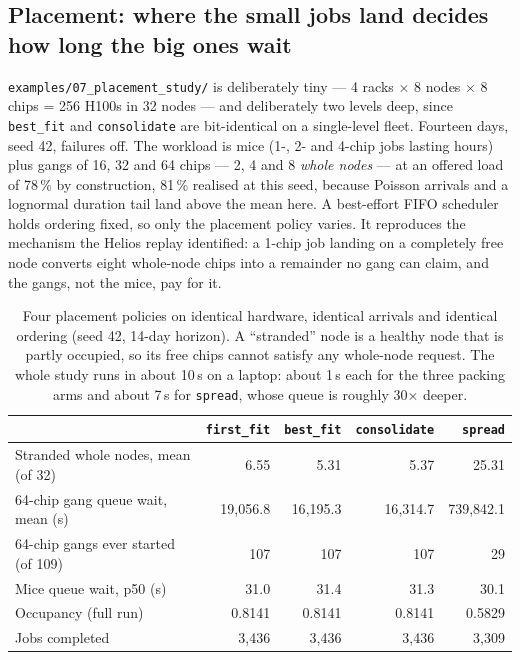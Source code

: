 \subsection{Placement: where the small jobs land decides how long the big ones
wait}\label{sec:case-placement}

\texttt{examples/07\_placement\_study/} is deliberately tiny --- 4 racks
$\times$ 8 nodes $\times$ 8 chips = 256 H100s in 32 nodes --- and deliberately
two levels deep, since \texttt{best\_fit} and \texttt{consolidate} are
bit-identical on a single-level fleet. Fourteen days, seed 42, failures off.
The workload is mice (1-, 2- and 4-chip jobs lasting hours) plus gangs of
16, 32 and 64 chips --- 2, 4 and 8 \emph{whole nodes} --- at an offered load of
78\,\% by construction, 81\,\% realised at this seed, because Poisson arrivals
and a lognormal duration tail land above the mean here. A best-effort FIFO
scheduler holds ordering fixed, so only the
placement policy varies. It reproduces the mechanism the Helios replay
identified: a 1-chip job landing on a completely free node converts eight
whole-node chips into a remainder no gang can claim, and the gangs, not the
mice, pay for it.

\begin{table}[t]
\centering
\begin{tabular}{lrrrr}
\toprule
 & \texttt{first\_fit} & \texttt{best\_fit} & \texttt{consolidate} & \texttt{spread} \\
\midrule
Stranded whole nodes, mean (of 32) & 6.55 & 5.31 & 5.37 & 25.31 \\
64-chip gang queue wait, mean (s) & 19{,}056.8 & 16{,}195.3 & 16{,}314.7 & 739{,}842.1 \\
64-chip gangs ever started (of 109) & 107 & 107 & 107 & 29 \\
Mice queue wait, p50 (s) & 31.0 & 31.4 & 31.3 & 30.1 \\
Occupancy (full run) & 0.8141 & 0.8141 & 0.8141 & 0.5829 \\
Jobs completed & 3{,}436 & 3{,}436 & 3{,}436 & 3{,}309 \\
\bottomrule
\end{tabular}
\caption{Four placement policies on identical hardware, identical arrivals and
identical ordering (seed 42, 14-day horizon). A ``stranded'' node is a healthy
node that is partly occupied, so its free chips cannot satisfy any whole-node
request. The whole study runs in about 10\,s on a laptop: about 1\,s each for
the three packing arms and about 7\,s for \texttt{spread}, whose queue is
roughly 30$\times$ deeper.}
\label{tab:placement}
\end{table}

